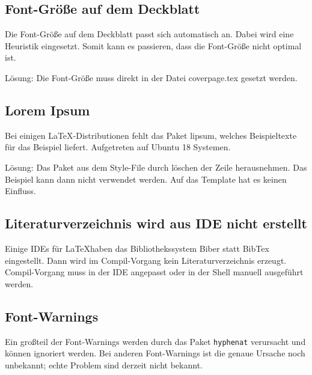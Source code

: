 \subsection{Font-Größe auf dem Deckblatt}
Die Font-Größe auf dem Deckblatt passt sich automatisch an. Dabei wird eine Heuristik eingesetzt. Somit kann es passieren, dass die Font-Größe nicht optimal ist.

Lösung: Die Font-Größe muss direkt in der Datei coverpage.tex gesetzt werden.

\subsection{Lorem Ipsum}
Bei einigen \LaTeX -Distributionen fehlt das Paket lipsum, welches Beispieltexte für das Beispiel liefert. Aufgetreten auf  Ubuntu 18 Systemen.

Lösung: Das Paket aus dem Style-File durch löschen der Zeile herausnehmen. Das Beispiel kann dann nicht verwendet werden. Auf das Template hat es keinen Einfluss.

\subsection{Literaturverzeichnis wird aus IDE nicht erstellt}
Einige IDEs für \LaTeX haben das Bibliothekssystem Biber statt BibTex eingestellt. Dann wird im Compil-Vorgang kein Literaturverzeichnis erzeugt. Compil-Vorgang muss in der IDE angepasst oder in der Shell manuell ausgeführt werden.

\subsection{Font-Warnings}
Ein großteil der Font-Warnings werden durch das Paket \texttt{hyphenat} verursacht und können ignoriert werden. Bei anderen Font-Warnings ist die genaue Ursache noch unbekannt; echte Problem sind derzeit nicht bekannt.